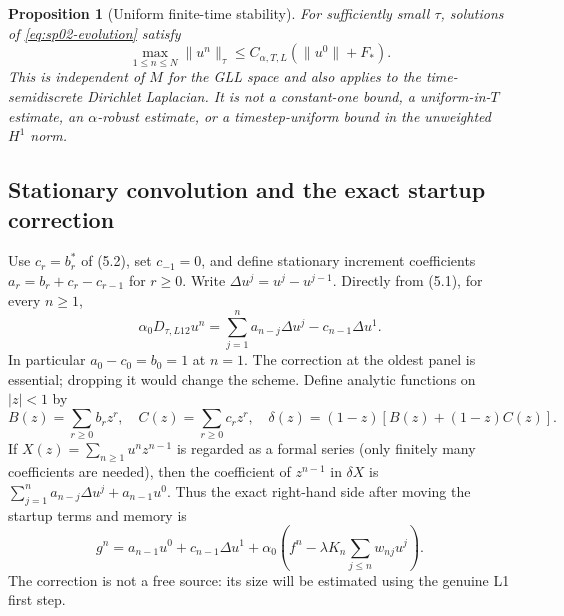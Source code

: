 \documentclass[11pt,a4paper]{amsart}
\theoremstyle{remark}
\theoremstyle{plain}
\newtheorem{proposition}{Proposition}[section]
\theoremstyle{remark}
\numberwithin{equation}{section}
\begin{document}
\begin{proposition}[Uniform finite-time stability]\label{prop:sp02-stability}
For sufficiently small $\tau$, solutions of \eqref{eq:sp02-evolution} satisfy
\[
 \max_{1\le n\le N}\|u^n\|_\tau\le C_{\alpha,T,L}(\|u^0\|+F_*).
\]
This is independent of $M$ for the GLL space and also applies to the time-semidiscrete Dirichlet Laplacian. It is not a constant-one bound, a uniform-in-$T$ estimate, an $\alpha$-robust estimate, or a timestep-uniform bound in the unweighted $H^1$ norm.
\end{proposition}

\subsection{Stationary convolution and the exact startup correction}
Use $c_r=b_r^*$ of (5.2), set $c_{-1}=0$, and define stationary increment coefficients $a_r=b_r+c_r-c_{r-1}$ for $r\ge0$. Write $\Delta u^j=u^j-u^{j-1}$. Directly from (5.1), for every $n\ge1$,
\begin{equation}\label{eq:sp02-start}
 \alpha_0D_{\tau,L12}u^n=\sum_{j=1}^na_{n-j}\Delta u^j-c_{n-1}\Delta u^1.
\end{equation}
In particular $a_0-c_0=b_0=1$ at $n=1$. The correction at the oldest panel is essential; dropping it would change the scheme. Define analytic functions on $|z|<1$ by
\[
 B(z)=\sum_{r\ge0}b_rz^r,\quad C(z)=\sum_{r\ge0}c_rz^r,\quad
 \delta(z)=(1-z)[B(z)+(1-z)C(z)].
\]
If $X(z)=\sum_{n\ge1}u^nz^{n-1}$ is regarded as a formal series (only finitely many coefficients are needed), then the coefficient of $z^{n-1}$ in $\delta X$ is $\sum_{j=1}^na_{n-j}\Delta u^j+a_{n-1}u^0$. Thus the exact right-hand side after moving the startup terms and memory is
\begin{equation}\label{eq:sp02-RHS}
 g^n=a_{n-1}u^0+c_{n-1}\Delta u^1+\alpha_0(f^n-\lambda K_n\sum_{j\le n}w_{nj}u^j).
\end{equation}
The correction is not a free source: its size will be estimated using the genuine L1 first step.
\end{document}
